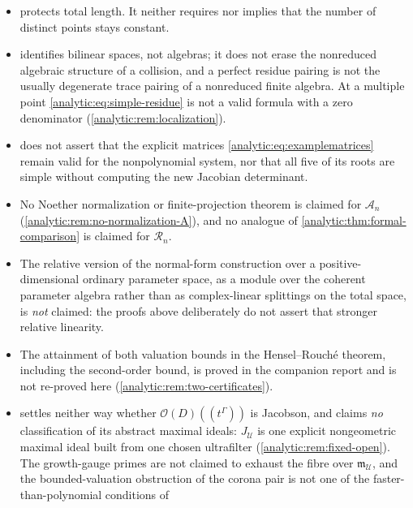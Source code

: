 \documentclass[11pt,letterpaper]{article}
\theoremstyle{definition}
\theoremstyle{remark}
\newcommand{\A}{\mathscr A}
\newcommand{\RR}{\mathscr R}
\newcommand{\UU}{\mathcal U}
\newcommand{\m}{\mathfrak m}
\newcommand{\OO}{\mathcal O}
\numberwithin{equation}{section}
\begin{document}
\begin{itemize}
unconditional. More generally, the arguments are algebraic and
support-theoretic rather than a complexity analysis: the set of dependencies
of a fixed coefficient is finite, but an arbitrary ordered group or support
need not have an effective representation from which those dependencies can
be enumerated.
\item {} protects total length. It neither requires
nor implies that the number of distinct points stays constant.
\item {} identifies bilinear spaces, not
algebras; it does not erase the nonreduced algebraic structure of a
collision, and a perfect residue pairing is not the usually degenerate trace
pairing of a nonreduced finite algebra. At a multiple point
\eqref{analytic:eq:simple-residue} is not a valid formula with a zero
denominator (\cref{analytic:rem:localization}).
\item {} does not assert that the explicit
matrices \eqref{analytic:eq:examplematrices} remain valid for the
nonpolynomial system, nor that all five of its roots are simple without
computing the new Jacobian determinant.
\item No Noether normalization or finite-projection theorem is claimed for
$\A_n$ (\cref{analytic:rem:no-normalization-A}), and no analogue of
\cref{analytic:thm:formal-comparison} is claimed for $\RR_n$.
\item The relative version of the normal-form construction over a
positive-dimensional ordinary parameter space, as a module over the
coherent parameter algebra rather than as complex-linear splittings on the
total space, is \emph{not} claimed: the proofs above deliberately do not
assert that stronger relative linearity.
\item The attainment of both valuation bounds in the Hensel--Rouch\'e
theorem, including the second-order bound, is proved in the companion
report \cite{FiniteDeformations} and is not re-proved here
(\cref{analytic:rem:two-certificates}).
\item {} settles neither way whether
$\OO(D)((t^\Gamma))$ is Jacobson, and claims \emph{no} classification of
its abstract maximal ideals: $J_\UU$ is one explicit nongeometric maximal
ideal built from one chosen ultrafilter
(\cref{analytic:rem:fixed-open}). The growth-gauge primes are not claimed
to exhaust the fibre over $\m_\UU$, and the bounded-valuation obstruction
of the corona pair is not one of the faster-than-polynomial conditions of

\end{itemize}
\end{document}
